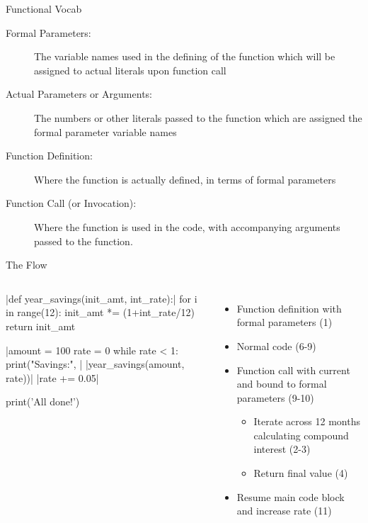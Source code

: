 \documentclass[pdf, aspectratio=169, 12pt]{beamer}
\begin{document}
\begin{frame}{Functional Vocab}
	\begin{description}
		\item[Formal Parameters:] The variable names used in the defining of the function which will be assigned to actual literals upon function call
		\item[Actual Parameters or Arguments:] The numbers or other literals passed to the function which are assigned the formal parameter variable names
		\item[Function Definition:] Where the function is actually defined, in terms of formal parameters
		\item[Function Call (or Invocation):] Where the function is used in the code, with accompanying arguments passed to the function. 
	\end{description}
\end{frame}

\begin{frame}[fragile]{The Flow}
	\begin{columns}
		{\footnotesize
			\begin{pythoncode}[numbers=left]
			|def year_savings(init_amt, int_rate):|
				for i in range(12):
					init_amt *= (1+int_rate/12)
				return init_amt

			|amount = 100
			rate = 0
			while rate < 1:
				print("Savings:", |
					|year_savings(amount, rate))|
				|rate += 0.05|

			print('All done!')
		\end{pythoncode}
		}
		\begin{itemize}
			\item<1,5> Function definition with formal parameters (1)
			\item<2,5> Normal code (6-9)
			\item<3,5> Function call with current  and  bound to formal parameters (9-10)
				\begin{itemize}
					\item Iterate across 12 months calculating compound interest (2-3)
					\item Return final value (4)
				\end{itemize}
			\item<4,5> Resume main code block and increase rate (11)
		\end{itemize}
	\end{columns}
\end{frame}
\end{document}
